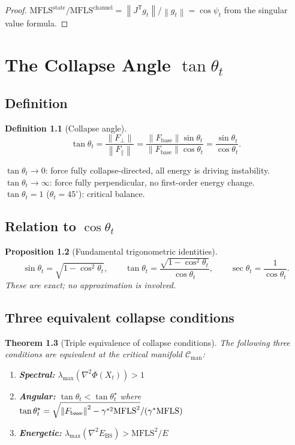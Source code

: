 \documentclass[11pt,a4paper,openany]{book}
\newtheorem{theorem}{Theorem}[chapter]
\newtheorem{proposition}[theorem]{Proposition}
\theoremstyle{definition}
\newtheorem{definition}[theorem]{Definition}
\newcommand{\T}{^{\mathsf{T}}}
\newcommand{\norm}[1]{\left\|#1\right\|}
\newcommand{\Fbase}{F_{\mathrm{base}}}
\newcommand{\mfls}{\mathrm{MFLS}}
\begin{document}
\begin{proof}
$\mfls^\mathrm{state}/\mfls^\mathrm{channel} = \norm{J\T g_t}/\norm{g_t} = \cos\psi_t$
from the singular value formula.
\end{proof}

\chapter{The Collapse Angle $\tan\theta_t$}

\section{Definition}

\begin{definition}[Collapse angle]
\[
\tan\theta_t = \frac{\norm{F_\perp}}{\norm{F_\parallel}} = \frac{\norm{\Fbase}\sin\theta_t}{\norm{\Fbase}\cos\theta_t} = \frac{\sin\theta_t}{\cos\theta_t}.
\]
\end{definition}

$\tan\theta_t \to 0$: force fully collapse-directed, all energy is driving instability.\\
$\tan\theta_t \to \infty$: force fully perpendicular, no first-order energy change.\\
$\tan\theta_t = 1$ ($\theta_t = 45^\circ$): critical balance.

\section{Relation to $\cos\theta_t$}

\begin{proposition}[Fundamental trigonometric identities]
\[
\sin\theta_t = \sqrt{1 - \cos^2\theta_t}, \qquad
\tan\theta_t = \frac{\sqrt{1-\cos^2\theta_t}}{\cos\theta_t}, \qquad
\sec\theta_t = \frac{1}{\cos\theta_t}.
\]
These are exact; no approximation is involved.
\end{proposition}

\section{Three equivalent collapse conditions}

\begin{theorem}[Triple equivalence of collapse conditions]
The following three conditions are equivalent at the critical manifold $\mathcal{C}_\mathrm{man}$:

\begin{enumerate}[label=(\Roman*)]
\item \textbf{Spectral:} $\lambda_\mathrm{max}(\nabla^2\Phi(X_t)) > 1$
\item \textbf{Angular:} $\tan\theta_t < \tan\theta_t^\star$ where
  $\tan\theta_t^\star = \sqrt{\norm{\Fbase}^2 - \gamma^{*2}\mfls^2\null}/(\gamma^*\mfls)$
\item \textbf{Energetic:} $\lambda_\mathrm{max}(\nabla^2 E_\mathrm{BS}) > \mfls^2/E$
\end{enumerate}
\end{theorem}
\end{document}

